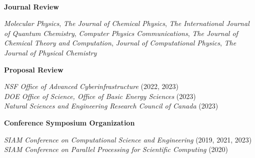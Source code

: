 \documentclass[10pt]{res} %
\begin{document}
\begin{resume}
~\\
\centerline{\bf Journal Review}
\vspace{-20pt}
\begin{center}
  \emph{Molecular Physics}, 
  \emph{The Journal of Chemical Physics}, 
  \emph{The International Journal of Quantum Chemistry}, 
  \emph{Computer Physics Communications},
  \emph{The Journal of Chemical Theory and Computation},
  \emph{Journal of Computational Physics},
  \emph{The Journal of Physical Chemistry} 
\end{center}

\centerline{\bf Proposal Review}
\vspace{-15pt}
\begin{center}
\emph{NSF Office of Advanced Cyberinfrastructure} \hfill (2022, 2023) \\
\emph{DOE Office of Science, Office of Basic Energy Sciences} \hfill (2023) \\
\emph{Natural Sciences and Engineering Research Council of Canada} \hfill (2023)
\end{center}

\centerline{\bf Conference Symposium Organization}
\vspace{-15pt}
\begin{center}
\emph{SIAM Conference on Computational Science and Engineering}        \hfill (2019, 2021, 2023) \\
\emph{SIAM Conference on Parallel Processing for Scientific Computing} \hfill (2020)
\end{center}


\end{resume}
\end{document}
